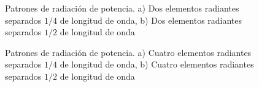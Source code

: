 \begin{figure}[H]
	\centering
	\caption{Patrones de radiación de potencia. a) Dos elementos radiantes separados $1/4$ de longitud de onda, b)
	Dos elementos radiantes separados $1/2$ de longitud de onda}
	\label{fig:twoArrayPat}
\end{figure}

\begin{figure}[H]
	\centering
	\caption{Patrones de radiación de potencia. a) Cuatro elementos radiantes separados $1/4$ de longitud de onda, b)
	Cuatro elementos radiantes separados $1/2$ de longitud de onda}
	\label{fig:fourArrayPat}
\end{figure}

